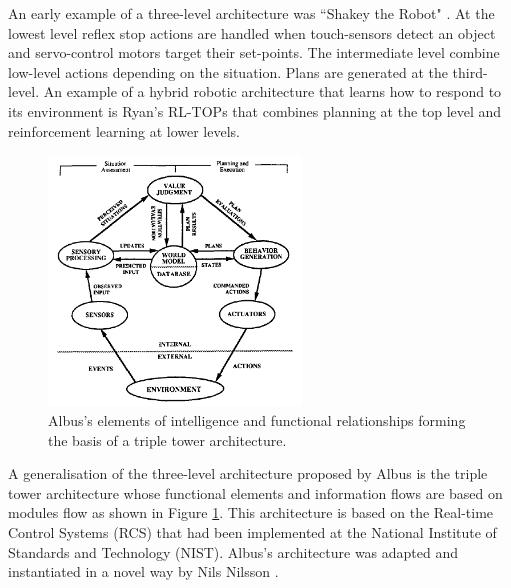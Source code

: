 \documentclass[pdftex,11pt,a4paper]{report}
\begin{document}
An early example of a three-level architecture was ``Shakey the Robot" \cite{nilsson84shakey}. At the lowest level reflex stop actions are handled when touch-sensors detect an object and servo-control motors target their set-points. The intermediate level combine low-level actions depending on the situation. Plans are generated at the third-level. An example of a hybrid robotic architecture that learns how to respond to its environment is Ryan's RL-TOPs \cite{ryan00using} that combines planning at the top level and reinforcement learning at lower levels. 

\begin{figure}[ht]
\centering
\includegraphics[width=0.6\textwidth]{figures/AlbusRoboticArchitecture91}
\caption{Albus's elements of intelligence and functional relationships forming the basis of a triple tower architecture.} \label{figAlbusRoboticArchitecture91}
\end{figure}

A generalisation of the three-level architecture proposed by Albus \cite{albus91outline} is the  triple tower architecture whose functional elements and information flows are based on modules flow as shown in Figure \ref{figAlbusRoboticArchitecture91}. This architecture is based on the Real-time Control Systems (RCS) that had been implemented at the National Institute of Standards and Technology (NIST). Albus's architecture was adapted and instantiated in a novel way by Nils Nilsson \cite{nilsson94teleoreactive}. 
\end{document}
